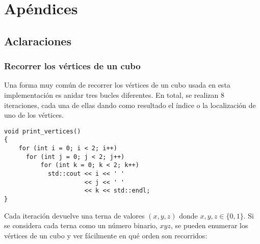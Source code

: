 \chapter*{Apéndices}
\appendix
{}
\renewcommand{\thechapter}{\Alph{section}}

\section{Aclaraciones}

\subsection{Recorrer los vértices de un cubo}

Una forma muy común de recorrer los vértices de un cubo usada en esta implementación es anidar tres bucles diferentes. En total, se realizan 8 iteraciones, cada una de ellas dando como resultado el índice o la localización de uno de los vértices.

\begin{minipage}{0.5\textwidth}
 \begin{lstlisting}[basicstyle=\footnotesize]
void print_vertices()
{
    for (int i = 0; i < 2; i++)
      for (int j = 0; j < 2; j++)
          for (int k = 0; k < 2; k++)
            std::cout << i << ' '
                      << j << ' '
                      << k << std::endl;
}
 \end{lstlisting}
\end{minipage}
\begin{minipage}{0.5\textwidth}
\end{minipage}
Cada iteración devuelve una terna de valores $(x,y,z)$ donde $x,y,z\in\{0,1\}$. Si se considera cada terna como un número binario, $xyz$, se pueden enumerar los vértices de un cubo y ver fácilmente en qué orden son recorridos:

